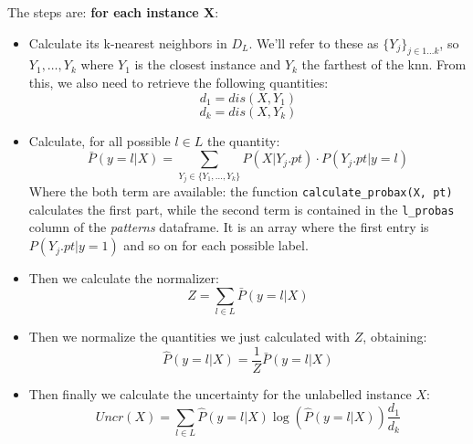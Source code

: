 The steps are: \textbf{for each instance X}:
\begin{itemize}
    \item Calculate its k-nearest neighbors in $D_L$. We'll refer to these as 
    $\{Y_j\}_{j\in 1\dots k}$, so ${Y_1, \dots, Y_k}$ where $Y_1$ is the closest instance and $Y_k$ the 
    farthest of the k\-nn.
    From this, we also need to retrieve the following quantities:
    \begin{equation}
        d_1 = dis(X, Y_1) 
    \end{equation}
    \begin{equation}
        d_k = dis(X, Y_k) 
    \end{equation}

    \item  Calculate, for all possible $l \in L$ the quantity:
    \begin{equation}
        \bar{P}(y = l | X) = \sum_{Y_j \in \{Y_1, \dots, Y_k\}} P(X | Y_j.pt) \cdot P(Y_j.pt | y = l)
    \end{equation}
    Where the both term are available: the function \texttt{calculate\_probax(X, pt)} calculates the 
    first part, while the second term is contained in the \texttt{l\_probas} column of the 
    \textit{patterns} dataframe. It is an array where the first entry is $P(Y_j.pt | y = 1)$ and 
    so on for each possible label.
    \item Then we calculate the normalizer:
    \begin{equation}
        Z = \sum_{l \in L} \bar{P}(y = l | X)
    \end{equation}
    \item Then we normalize the quantities we just calculated with $Z$, obtaining:
    \begin{equation}
        \hat{P}(y = l | X) = \frac{1}{Z}  \bar{P}(y = l | X)
    \end{equation}
    \item Then finally we calculate the uncertainty for the unlabelled instance $X$:
    \begin{equation}
        Uncr(X) = \sum_{l \in L} \hat{P}(y = l | X) \log \left( 
                \hat{P}(y = l | X)
        \right) \frac{d_1}{d_k}
    \end{equation}
\end{itemize}

